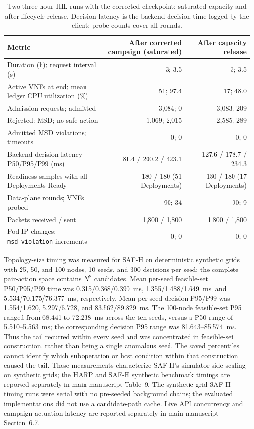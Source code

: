 \documentclass[final,5p]{elsarticle}
\newcommand{\rev}[1]{\textcolor{revisiongreen}{#1}}
\let\newrev\rev
\begin{document}
\begin{table}[p]
\centering
\caption{\newrev{Two three-hour HIL runs with the corrected checkpoint: saturated capacity and after lifecycle release. Decision latency is the backend decision time logged by the client; probe counts cover all rounds.}}
\label{tab:hil_longrun}
{\color{revisiongreen}
\small
\begin{tabular}{@{}lrr@{}}
\toprule
Metric & After corrected campaign (saturated) & After capacity release \\
\midrule
Duration (h); request interval (s) & 3; 3.5 & 3; 3.5 \\
Active VNFs at end; mean ledger CPU utilization (\%) & 51; 97.4 & 17; 48.0 \\
Admission requests; admitted & 3,084; 0 & 3,083; 209 \\
Rejected: MSD; no safe action & 1,069; 2,015 & 2,585; 289 \\
Admitted MSD violations; timeouts & 0; 0 & 0; 0 \\
Backend decision latency P50/P95/P99 (ms) & 81.4 / 200.2 / 423.1 & 127.6 / 178.7 / 234.3 \\
Readiness samples with all Deployments Ready & 180 / 180 (51 Deployments) & 180 / 180 (17 Deployments) \\
Data-plane rounds; VNFs probed & 90; 34 & 90; 9 \\
Packets received / sent & 1,800 / 1,800 & 1,800 / 1,800 \\
Pod IP changes; \texttt{msd\_violation} increments & 0; 0 & 0; 0 \\
\bottomrule
\end{tabular}

}
\end{table}

\newrev{Topology-size timing was measured for SAF-H on deterministic synthetic grids with 25, 50, and 100 nodes, 10 seeds, and 300 decisions per seed; the complete pair-action space contains $N^2$ candidates. Mean per-seed feasible-set P50/P95/P99 time was 0.315/0.368/0.390~ms, 1.355/1.488/1.649~ms, and 5.534/70.175/76.377~ms, respectively. Mean per-seed decision P95/P99 was 1.554/1.620, 5.297/5.728, and 83.562/89.829~ms. The 100-node feasible-set P95 ranged from 68.441 to 72.238~ms across the ten seeds, versus a P50 range of 5.510--5.563~ms; the corresponding decision P95 range was 81.643--85.574~ms. Thus the tail recurred within every seed and was concentrated in feasible-set construction, rather than being a single anomalous seed. The saved percentiles cannot identify which suboperation or host condition within that construction caused the tail. These measurements characterize SAF-H's simulator-side scaling on synthetic grids; the HARP and SAF-H synthetic benchmark timings are reported separately in main-manuscript Table~9. The synthetic-grid SAF-H timing runs were serial with no pre-seeded background chains; the evaluated implementations did not use a candidate-path cache. Live API concurrency and campaign actuation latency are reported separately in main-manuscript Section~6.7.}
\end{document}
